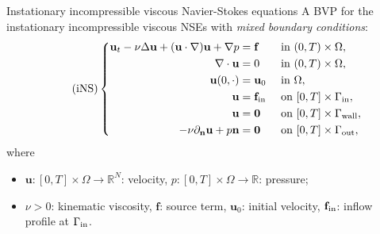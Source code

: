 \documentclass[10pt
hyperref={
    pdfauthor={Hong Quan Ba Nguyen},
    pdftitle={Optimal Shape Design of Air Ducts in Combustion Engines: Design a General Framework},
    pdfsubject={Talk},
    pdfcreator={LaTeX},
}
]{beamer}
\begin{document}
\begin{frame}{Instationary incompressible viscous Navier-Stokes equations}
    A BVP for the instationary incompressible viscous NSEs with \textit{mixed boundary conditions}:
    \begin{equation}
        \label{instationary incompressible viscous NSEs}
        \tag{iNS}
        \left\{\begin{split}
            \textbf{u}_t - \nu\Delta\textbf{u} + (\textbf{u}\cdot\nabla)\textbf{u} + \nabla p &= \textbf{f} &&\mbox{ in } (0,T)\times\Omega,\\
            \nabla\cdot\textbf{u} &= 0 &&\mbox{ in } (0,T)\times\Omega,\\
            \textbf{u}(0,\cdot) &= \textbf{u}_0 &&\mbox{ in } \Omega,\\
            \textbf{u} &= \textbf{f}_{\rm in} &&\mbox{ on } [0,T]\times\Gamma_{\rm in},\\
            \textbf{u} &= \textbf{0} &&\mbox{ on } [0,T]\times\Gamma_{\rm wall},\\
            -\nu\partial_{\textbf{n}}\textbf{u} + p\textbf{n} &= \textbf{0} &&\mbox{ on } [0,T]\times\Gamma_{\rm out},
        \end{split}\right.
    \end{equation}
    where \begin{itemize}
        \item $\textbf{u}:[0,T]\times\Omega\to\mathbb{R}^N$: velocity, $p:[0,T]\times\Omega\to\mathbb{R}$: pressure;
        \item $\nu > 0$: kinematic viscosity, $\textbf{f}$: source term, $\textbf{u}_0$: initial velocity, $\textbf{f}_{\rm in}$: inflow profile at $\Gamma_{\rm in}$.
    \end{itemize}
\end{frame}
\end{document}
